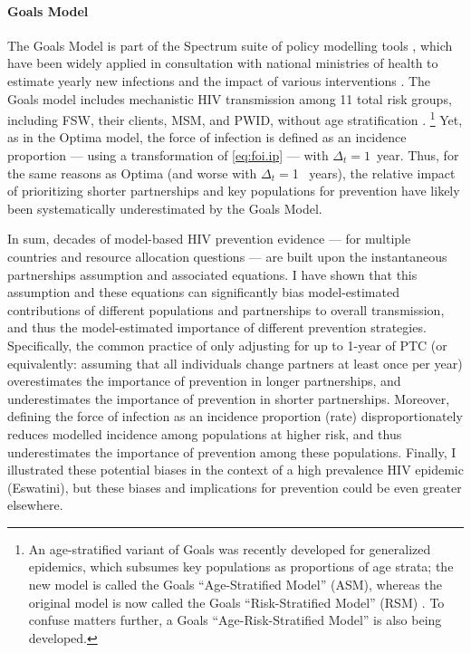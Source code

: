 \paragraph{Goals Model}\cite{Stover2014,Stover2021}
The Goals Model is part of the Spectrum suite of policy modelling tools \cite{Spectrum2022},
which have been widely applied in consultation with national ministries of health
to estimate yearly new infections and the impact of various interventions \cite{Stover2021}.
The Goals model includes mechanistic HIV transmission among 11 total risk groups, including
FSW, their clients, MSM, and PWID, without age stratification \cite{Stover2014}.%
\footnote{An age-stratified variant of Goals was recently developed for generalized epidemics,
  which subsumes key populations as proportions of age strata;
  the new model is called the Goals ``Age-Stratified Model'' (ASM), whereas
  the original model is now called the Goals ``Risk-Stratified Model'' (RSM) \cite{Stover2021}.
  To confuse matters further, a Goals ``Age-Risk-Stratified Model'' is also being developed.}
Yet, as in the Optima model, the force of infection is defined as an incidence proportion
--- using a transformation of \eqref{eq:foi.ip} --- with $\Delta_t = 1$~year.
Thus, for the same reasons as Optima (and worse with $\Delta_t = {}$1 ~years),
the relative impact of prioritizing shorter partnerships and key populations for prevention
have likely been systematically underestimated by the Goals Model.
\par
In sum, decades of model-based HIV prevention evidence
--- for multiple countries and resource allocation questions ---
are built upon the instantaneous partnerships assumption and associated equations.
I have shown that this assumption and these equations can significantly bias
model-estimated contributions of different populations and partnerships to overall transmission,
and thus the model-estimated importance of different prevention strategies.
Specifically, the common practice of only adjusting for up to 1-year of PTC
(or equivalently: assuming that all individuals change partners at least once per year)
overestimates the importance of prevention in longer partnerships, and
underestimates the importance of prevention in shorter partnerships.
Moreover, defining the force of infection as an incidence proportion (\vs rate)
disproportionately reduces modelled incidence among populations at higher risk,
and thus underestimates the importance of prevention among these populations.
Finally, I illustrated these potential biases
in the context of a high prevalence HIV epidemic (Eswatini),
but these biases and implications for prevention could be even greater elsewhere.
